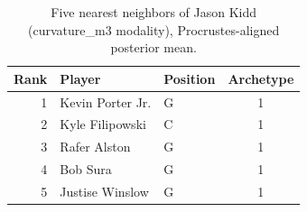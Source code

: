 \begin{table}[htbp]
  \centering\small
  \begin{tabular}{rllc}
    \toprule
    Rank & Player & Position & Archetype \\
    \midrule
    1 & Kevin Porter Jr. & G & 1 \\
    2 & Kyle Filipowski & C & 1 \\
    3 & Rafer Alston & G & 1 \\
    4 & Bob Sura & G & 1 \\
    5 & Justise Winslow & G & 1 \\
    \bottomrule
  \end{tabular}
  \caption{Five nearest neighbors of Jason Kidd (curvature_m3 modality), Procrustes-aligned posterior mean.}
  \label{tab:Jason_Kidd_neighbors_curvature_m3}
\end{table}

